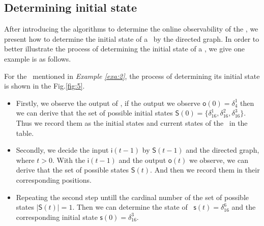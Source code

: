 \subsection{Determining initial state}

After introducing the algorithms to determine the online observability of the \BCNs, we present how to determine the initial state of a \BCN\ by the directed graph. In order to better illustrate the process of determining the initial state of a \BCN, we give one example is as follows.
\begin{example}
For the \BCN\ mentioned in {\em Example \ref{exa:2}}, the process of determining its initial state is shown in the Fig.\ref{fig:5}. 
\begin{itemize}
  \item Firstly, we observe the output of \BCN, if the output we observe $\mathsf{o}(0)=\delta_4^1$ then we can derive that the set of possible initial states $\mathsf{S}(0)=\{\delta_{16}^1,\delta_{16}^2,\delta_{16}^3\}$. Thus we record them as the initial states and current states of the \BCN\ in the table. 
  \item Secondly, we decide the input $\mathsf{i}(t-1)$ by $\mathsf{S}(t-1)$ and the directed graph, where $t>0$. With the $\mathsf{i}(t-1)$ and the output $\mathsf{o}(t)$ we observe, we can derive that the set of possible states $\mathsf{S}(t)$. And then we record them in their corresponding positions. 
 \item Repeating the second step untill the cardinal number of the set of possible states $|\mathsf{S}(t)|=1$. Then we can determine the state of \BCN\ $\mathsf{s}(t)=\delta_{16}^{6}$ and the corresponding initial state $\mathsf{s}(0)=\delta_{16}^{3}$.
\end{itemize} 
\end{example}   


